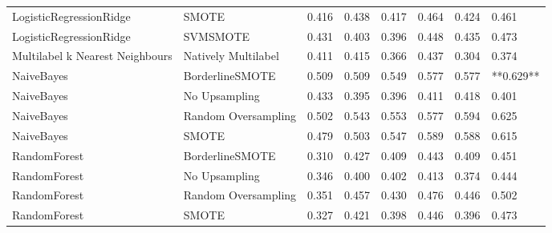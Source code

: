 \begin{tabular}{llllllll}
        LogisticRegressionRidge &                         SMOTE & 0.416 &                     0.438 &                 0.417 &                  0.464 &                                   0.424 &     0.461 \\
        LogisticRegressionRidge &                      SVMSMOTE & 0.431 &                     0.403 &                 0.396 &                  0.448 &                                   0.435 &     0.473 \\
Multilabel k Nearest Neighbours &           Natively Multilabel & 0.411 &                     0.415 &                 0.366 &                  0.437 &                                   0.304 &     0.374 \\
                     NaiveBayes &               BorderlineSMOTE & 0.509 &                     0.509 &                 0.549 &                  0.577 &                                   0.577 & **0.629** \\
                     NaiveBayes &                 No Upsampling & 0.433 &                     0.395 &                 0.396 &                  0.411 &                                   0.418 &     0.401 \\
                     NaiveBayes &           Random Oversampling & 0.502 &                     0.543 &                 0.553 &                  0.577 &                                   0.594 &     0.625 \\
                     NaiveBayes &                         SMOTE & 0.479 &                     0.503 &                 0.547 &                  0.589 &                                   0.588 &     0.615 \\
                   RandomForest &               BorderlineSMOTE & 0.310 &                     0.427 &                 0.409 &                  0.443 &                                   0.409 &     0.451 \\
                   RandomForest &                 No Upsampling & 0.346 &                     0.400 &                 0.402 &                  0.413 &                                   0.374 &     0.444 \\
                   RandomForest &           Random Oversampling & 0.351 &                     0.457 &                 0.430 &                  0.476 &                                   0.446 &     0.502 \\
                   RandomForest &                         SMOTE & 0.327 &                     0.421 &                 0.398 &                  0.446 &                                   0.396 &     0.473 \\

\end{tabular}
